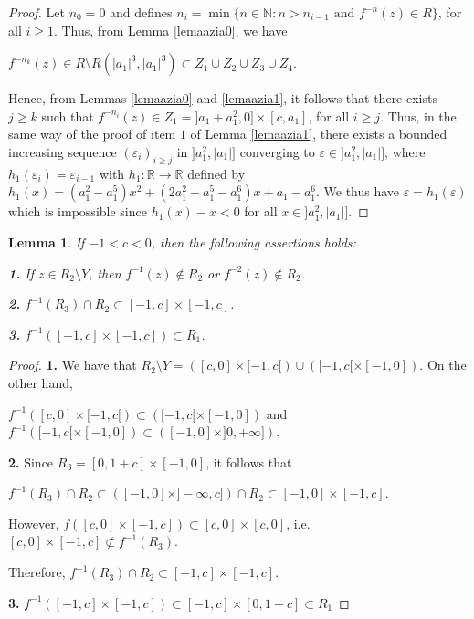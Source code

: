 \documentclass[11pt]{amsart}
\newtheorem{lemma}[theorem]{Lemma}
\theoremstyle{definition}
\begin{document}
\begin{proof}
	Let $n_0=0$ and defines $n_i=\min\{n\in\mathbb{N}:n>n_{i-1} \textrm{ and
	} f^{-n}(z)\in R\}$, for all $i\geq 1$.	Thus, from Lemma \ref{lemaazia0}, we have
	\begin{center}
		$f^{-n_{k}}(z)\in R\setminus R(|a_1|^3,|a_1|^3)\subset Z_1\cup Z_2\cup Z_3\cup Z_4$.
	\end{center}
	
Hence, from Lemmas \ref{lemaazia0} and \ref{lemaazia1}, it follows that there exists $j\geq k$ such that $f^{-n_i}(z)\in Z_1=]a_1+a_1^2,0]\times[c,a_1]$, for all $i\geq j$. Thus, in the same way of the proof of item $1$ of Lemma \ref{lemaazia1}, there exists a bounded increasing sequence $(\varepsilon_i)_{i\geq j}$ in $ ]a_1^2,|a_1|]$ converging to $\varepsilon\in ]a_1^2,|a_1|]$, where $h_1(\varepsilon_i)=\varepsilon_{i-1}$ with $h_1:\mathbb{R}\longrightarrow \mathbb{R}$ defined by $h_1(x)=(a_1^2-a_1^5)x^2+(2a_1^2-a_1^5-a_1^6)x+a_1-a_1^6$. We thus have $\varepsilon=h_1(\varepsilon)$ which is impossible since $h_1(x)-x<0$ for all $x\in ]a_1^2,|a_1|]$.
\end{proof}

\begin{lemma}
	If $-1<c<0$, then the following assertions holds:
	
	\noindent \textbf{1.} If $z\in R_2\setminus Y$, then $f^{-1}(z)\not\in
	R_2$ or $f^{-2}(z)\not\in R_2$.
	
	\noindent \textbf{2.} $f^{-1}(R_3)\cap  R_2\subset [-1,c]\times [-1,c]$.
	
	\noindent \textbf{3.} $f^{-1}([-1,c]\times[-1,c])\subset R_1$. \label{mula}
\end{lemma}
\begin{proof} \textbf{1.} We have that $R_2\setminus Y=([c,0]\times[-1,c[)\cup
	([-1,c[\times[-1,0])$. On the other hand,
	
	\begin{center}
		$f^{-1}([c,0]\times[-1,c[)\subset ([-1,c[\times[-1,0])$ and
		$f^{-1}([-1,c[\times[-1,0])\subset ([-1,0]\times]0,+\infty])$.
	\end{center}
	
	\noindent \textbf{2.} Since $R_3=[0,1+c]\times [-1,0]$, it follows that
	\begin{center}
		$f^{-1}(R_3)\cap R_2\subset([-1,0]\times]-\infty,c])\cap R_2\subset
		[-1,0]\times[-1,c]$.
	\end{center}
However,  $f([c,0]\times[-1,c])\subset [c,0]\times[c,0]$, i.e. $[c,0]\times[-1,c]\not\subset f^{-1}(R_3)$.

Therefore, $f^{-1}(R_3)\cap  R_2\subset [-1,c]\times [-1,c]$.
\begin{center}

\end{center}
	
	\noindent \textbf{3.}
	$f^{-1}([-1,c]\times[-1,c])\subset[-1,c]\times[0,1+c]\subset R_1$
\end{proof}
\end{document}
